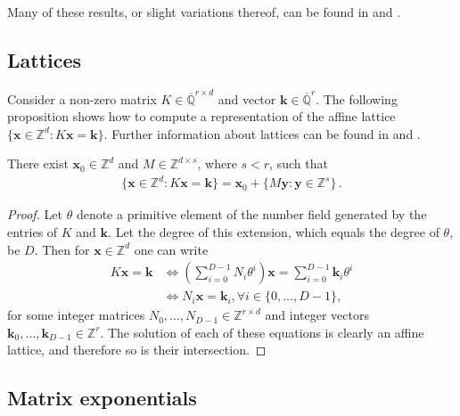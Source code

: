Many of these results, or slight variations thereof, can be found in \cite{HardyAndWright} and \cite{Cassels}.

\subsection{Lattices}

Consider a non-zero matrix $K\in\overline{\mathbb{Q}}^{r\times d}$ and vector
$\boldsymbol{k} \in \overline{\mathbb{Q}}^r$.  The following proposition shows
how to compute a representation of the affine lattice
$\{ \boldsymbol{x}\in\mathbb{Z}^d : K\boldsymbol{x} = \boldsymbol{k}
\}$.
Further information about lattices can be found in \cite{LatticeBook}
and \cite{Cohen}.

\begin{proposition}
There exist $\boldsymbol{x}_{0} \in \mathbb{Z}^{d}$ and
$M \in \mathbb{Z}^{d \times s}$, where $s < r$, such that
\begin{align*}
  \{ \boldsymbol{x}\in\mathbb{Z}^d : K\boldsymbol{x} =
  \boldsymbol{k} \} =
  \boldsymbol{x}_{0} + \{ M \boldsymbol{y} : \boldsymbol{y} \in \mathbb{Z}^s \} \, .
\end{align*}
\end{proposition}

\begin{proof}
  Let $\theta$ denote a primitive element of the number field
  generated by the entries of $K$ and $\boldsymbol{k}$. Let the degree
  of this extension, which equals the degree of $\theta$, be
  $D$. Then for $\boldsymbol{x} \in \mathbb{Z}^d$ one can write
\begin{align*}
K \boldsymbol{x} = \boldsymbol{k} &\Leftrightarrow \left( \sum \limits_{i=0}^{D-1} N_{i} \theta^{i} \right) \boldsymbol{x} = \sum \limits_{i=0}^{D-1} \boldsymbol{k}_{i} \theta^{i} \\
&\Leftrightarrow N_{i} \boldsymbol{x} = \boldsymbol{k}_{i}, \forall i \in \lbrace 0, \ldots, D-1 \rbrace ,
\end{align*}
for some integer matrices
$N_{0}, \ldots, N_{D-1} \in \mathbb{Z}^{r \times d}$ and integer
vectors
$\boldsymbol{k}_{0}, \ldots, \boldsymbol{k}_{D-1} \in \mathbb{Z}^{r}$.
The solution of each of these equations is clearly an affine lattice, and
therefore so is their intersection.
\end{proof}

\subsection{Matrix exponentials}


